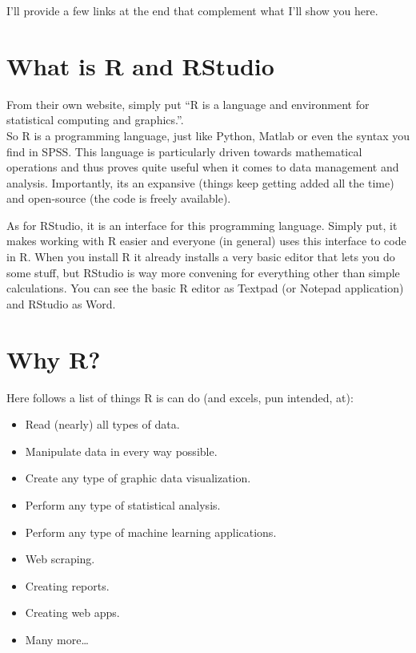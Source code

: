 \documentclass[
]{book}
\begin{document}
I'll provide a few links at the end that complement what I'll show you here.

\hypertarget{what-is-r-and-rstudio}{%
\section{What is R and RStudio}\label{what-is-r-and-rstudio}}

From their own website, simply put ``R is a language and environment for statistical computing and graphics.''.\\

So R is a programming language, just like Python, Matlab or even the syntax you find in SPSS.
This language is particularly driven towards mathematical operations and thus proves quite useful when it comes to data management and analysis.
Importantly, its an expansive (things keep getting added all the time) and open-source (the code is freely available).

As for RStudio, it is an interface for this programming language.
Simply put, it makes working with R easier and everyone (in general) uses this interface to code in R.
When you install R it already installs a very basic editor that lets you do some stuff, but RStudio is way more convening for everything other than simple calculations.
You can see the basic R editor as Textpad (or Notepad application) and RStudio as Word.

\hypertarget{why-r}{%
\section{Why R?}\label{why-r}}

Here follows a list of things R is can do (and excels, pun intended, at):

\begin{itemize}
\item
  Read (nearly) all types of data.
\item
  Manipulate data in every way possible.
\item
  Create any type of graphic data visualization.
\item
  Perform any type of statistical analysis.
\item
  Perform any type of machine learning applications.
\item
  Web scraping.
\item
  Creating reports.
\item
  Creating web apps.
\item
  Many more\ldots{}
\end{itemize}
\end{document}
